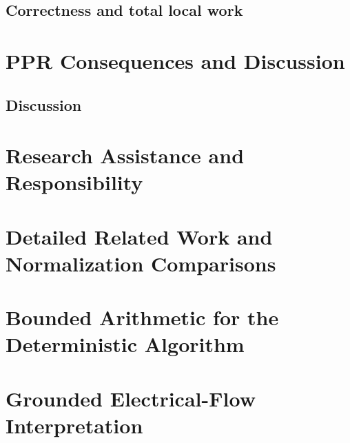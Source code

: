 \documentclass[pmlr,11pt,twoside]{jmlr}
\begin{document}
\subsection{Correctness and total local work}\label{sec:threshold-batch-analysis}


\section{PPR Consequences and Discussion}\label{sec:two-stage-ppr}


\subsection{Discussion}\label{sec:conclusion}


\section*{Research Assistance and Responsibility}






\clearpage
\appendix
\section{Detailed Related Work and Normalization Comparisons}
\label{app:related-work}


\section{Bounded Arithmetic for the Deterministic Algorithm}
\label{app:bounded-arithmetic}




\section{Grounded Electrical-Flow Interpretation}
\label{app:grounded-flow-dual}

\end{document}
